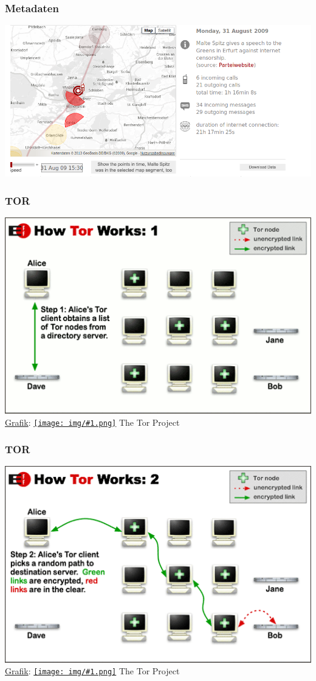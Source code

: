 \documentclass[12pt]{beamer}
\newcommand{\cc}[1]{\texttt{[image: img/\#1.png]}\hspace{1mm}}
\begin{document}
\begin{frame}
    \frametitle{Metadaten}
    \includegraphics[height=0.7\textheight]{img/maltespitz.png}
\end{frame}

\begin{frame}
    \frametitle{TOR}
    \includegraphics[height=0.7\textheight]{img/tor1.png}
    \\{\small \href{https://www.torproject.org/images/htw1.png}{Grafik}: \href{https://creativecommons.org/licenses/by/3.0/us/}{\cc{by}} The Tor Project}
\end{frame}

\begin{frame}
    \frametitle{TOR}
    \includegraphics[height=0.7\textheight]{img/tor2.png}
    \\{\small \href{https://www.torproject.org/images/htw2.png}{Grafik}: \href{https://creativecommons.org/licenses/by/3.0/us/}{\cc{by}} The Tor Project}
\end{frame}
\end{document}
